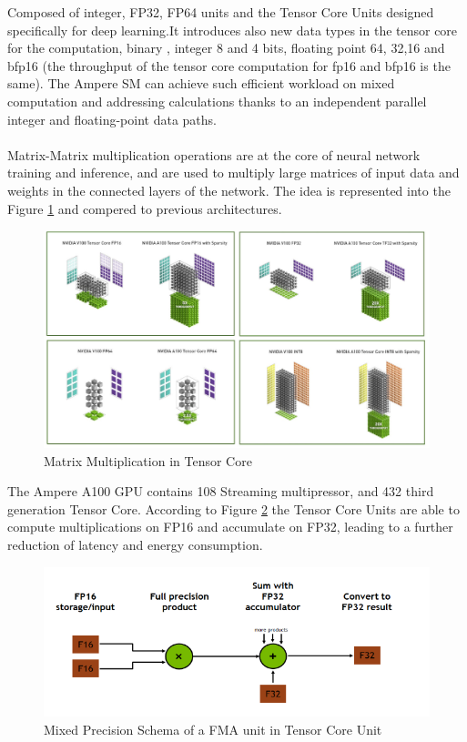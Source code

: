 Composed of integer, FP32, FP64 units and the Tensor Core Units designed specifically for deep learning.It introduces also new data types in the tensor core for the computation, binary , integer 8 and 4 bits, floating point 64, 32,16 and bfp16 (the throughput of the tensor core computation for fp16 and bfp16 is the same). The Ampere SM can achieve such efficient workload on mixed computation and addressing calculations thanks to an independent parallel integer and floating-point data paths. \\\\

Matrix-Matrix multiplication operations are at the core of neural network training and inference, and are used to multiply large matrices of input data and weights in the connected layers of the network. The idea is represented into the Figure \ref{fig:tensorcorevolta} and compered to previous architectures.

\begin{figure}[!htbp]
\centering
\captionsetup{justification=centering}
\includegraphics[scale=0.6]{./figure/tensor_core.PNG}
\caption{Matrix Multiplication in Tensor Core\cite{paper:41}}
\label{fig:tensorcorevolta}
\end{figure}

The Ampere A100 GPU contains 108 Streaming multipressor, and 432 third generation Tensor Core.
According to Figure \ref{fig:mixprec} the Tensor Core Units are able to compute multiplications on FP16 and accumulate on FP32, leading to a further reduction of latency and energy consumption.
\begin{figure}[!htbp]
\centering
\captionsetup{justification=centering}
\includegraphics[scale=0.8]{./figure/mix_prec.PNG}
\caption{Mixed Precision Schema of a FMA unit in Tensor Core Unit\cite{paper:41}}
\label{fig:mixprec}
\end{figure}

